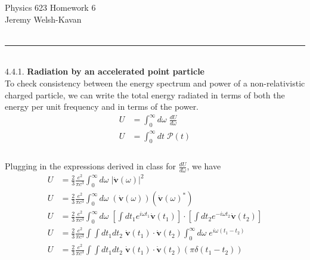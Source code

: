 \documentclass[]{article}
\begin{document}
{\Large Physics 623 Homework 6}\\
{Jeremy Welsh-Kavan}\\
\hfill \\
\noindent\rule{15cm}{0.4pt} \\

4.4.1. {\bf Radiation by an accelerated point particle} \\

To check consistency between the energy spectrum and power of a non-relativistic charged particle, we can write the total energy radiated in terms of both the energy per unit frequency and in terms of the power. \\

\begin{equation}
\begin{aligned}
U & = \int_{0}^{\infty} d\omega \; \frac{dU}{d\omega} \\
U & = \int_{0}^{\infty} dt \; \mathscr{P}(t) \\
\end{aligned}
\end{equation} \\

Plugging in the expressions derived in class for $ \frac{dU}{d\omega}$, we have \\

\begin{equation}
\begin{aligned}
U & = \frac{2}{3} \frac{e^2}{\pi c^3} \int_{0}^{\infty} d\omega \;  |\dot{\bm{v}}(\omega)|^2 \\
U & = \frac{2}{3} \frac{e^2}{\pi c^3} \int_{0}^{\infty} d\omega \;  \left( \dot{\bm{v}}(\omega) \right) \left( \dot{\bm{v}}(\omega)^* \right) \\
U & = \frac{2}{3} \frac{e^2}{\pi c^3} \int_{0}^{\infty} d\omega \;  \left[\int dt_1 e^{i\omega t_1} \dot{\bm{v}}(t_1)\right] \cdot \left[ \int dt_2 e^{-i\omega t_2} \dot{\bm{v}}(t_2) \right] \\
U & = \frac{2}{3} \frac{e^2}{\pi c^3}  \int \int dt_1 dt_2 \;  \dot{\bm{v}}(t_1) \cdot \dot{\bm{v}}(t_2)\int_{0}^{\infty} d\omega \; e^{i\omega (t_1-t_2)}   \\
U & = \frac{2}{3} \frac{e^2}{\pi c^3}  \int \int dt_1 dt_2 \; \dot{\bm{v}}(t_1) \cdot \dot{\bm{v}}(t_2) \left( \pi \delta(t_1 - t_2) \right)  \\
\end{aligned}
\end{equation} \\
\end{document}
